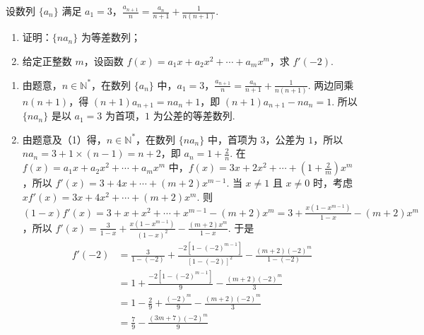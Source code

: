 \documentclass[UTF8,a4paper,oneside,11pt]{ctexbook}
\begin{document}
\begin{problem}
设数列 \(\{a_n\}\) 满足 \(a_1 = 3\)，\(\frac{a_{n+1}}{n} = \frac{a_n}{n+1} + \frac{1}{n(n+1)}\).

\begin{enumerate}
\item 证明：\(\{na_n\}\) 为等差数列；
\item 给定正整数 \(m\)，设函数 \(f(x) = a_1x + a_2x^2 + \cdots + a_mx^m\)，求 \(f'(-2)\).
\end{enumerate}
\end{problem}

\begin{solution}
\begin{enumerate}
\item 由题意，\(n \in \mathbb{N}^*\)，在数列 \(\{a_n\}\) 中，\(a_1 = 3\)，\(\frac{a_{n+1}}{n} = \frac{a_n}{n+1} + \frac{1}{n(n+1)}\). 两边同乘 \(n(n+1)\)，得 \((n+1)a_{n+1} = na_n + 1\)，即 \((n+1)a_{n+1} - na_n = 1\). 所以 \(\{na_n\}\) 是以 \(a_1 = 3\) 为首项，\(1\) 为公差的等差数列.

\item 由题意及（1）得，\(n \in \mathbb{N}^*\)，在数列 \(\{na_n\}\) 中，首项为 \(3\)，公差为 \(1\)，所以 \(na_n = 3 + 1 \times (n-1) = n+2\)，即 \(a_n = 1 + \frac{2}{n}\). 在 \(f(x) = a_1x + a_2x^2 + \cdots + a_mx^m\) 中，\(f(x) = 3x + 2x^2 + \cdots + \left(1 + \frac{2}{m}\right)x^m\)，所以 \(f'(x) = 3 + 4x + \cdots + (m+2)x^{m-1}\). 当 \(x \neq 1\) 且 \(x \neq 0\) 时，考虑 \(xf'(x) = 3x + 4x^2 + \cdots + (m+2)x^m\). 则 \((1-x)f'(x)=3+x+x^2+\cdots+x^{m-1}-(m+2)x^m=3+\frac{x(1-x^{m-1})}{1-x}-(m+2)x^m\)，所以 \(f'(x) = \frac{3}{1-x} + \frac{x(1-x^{m-1})}{(1-x)^2} - \frac{(m+2)x^m}{1-x}\).
于是
\begin{align*}
f'(-2)
&= \frac{3}{1-(-2)} + \frac{-2[1-(-2)^{m-1}]}{[1-(-2)]^2} - \frac{(m+2)(-2)^m}{1-(-2)} \\
&= 1 + \frac{-2[1-(-2)^{m-1}]}{9} - \frac{(m+2)(-2)^m}{3} \\
&= 1 - \frac{2}{9} + \frac{(-2)^m}{9} - \frac{(m+2)(-2)^m}{3} \\
&= \frac{7}{9} - \frac{(3m+7)(-2)^m}{9}
\end{align*}
\end{enumerate}
\end{solution}
\end{document}
